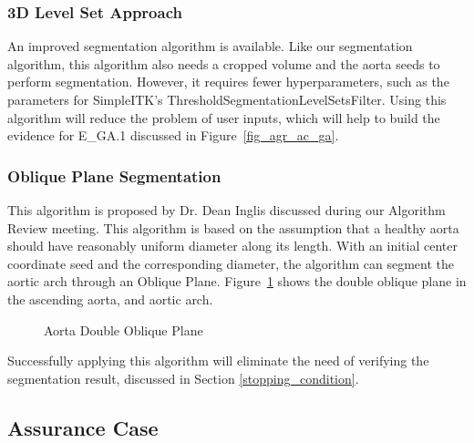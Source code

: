 \subsubsection{3D Level Set Approach}\label{new_seg}
An improved segmentation algorithm \cite{6346433} is available. Like our segmentation algorithm, this algorithm also needs a cropped volume and the aorta seeds to perform segmentation. However, it requires fewer hyperparameters, such as the parameters for SimpleITK's ThresholdSegmentationLevelSetsFilter. Using this algorithm will reduce the problem of user inputs, which will help to build the evidence for E\_GA.1 discussed in Figure~\ref{fig_agr_ac_ga}.

\subsubsection{Oblique Plane Segmentation}\label{inglis_seg}
This algorithm is proposed by Dr. Dean Inglis discussed during our Algorithm Review meeting. This algorithm is based on the assumption that a healthy aorta should have reasonably uniform diameter along its length. With an initial center coordinate seed and the corresponding diameter, the algorithm can segment the aortic arch through an Oblique Plane. Figure~\ref{fig_oblique} shows the double oblique plane in the ascending aorta, and aortic arch.

\begin{figure}[H]
    \centering
    \caption[Aorta Double Oblique Plane]{Aorta Double Oblique Plane}
    \label{fig_oblique}
\end{figure}

Successfully applying this algorithm will eliminate the need of verifying the segmentation result, discussed in Section \ref{stopping_condition}.

\subsection{Assurance Case}

